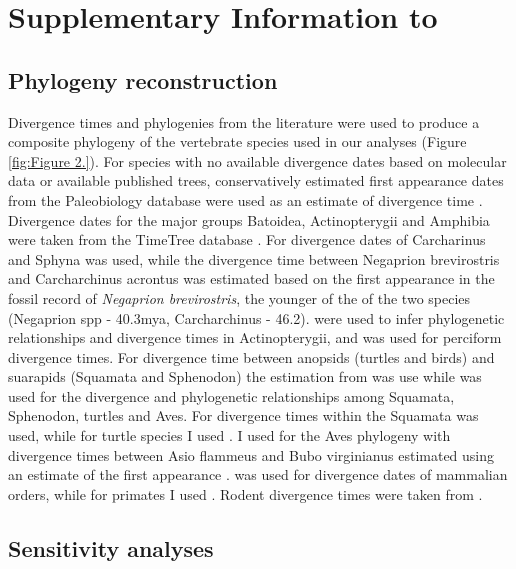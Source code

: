 \chapter{Supplementary Information to }%
\label{chap:Appendix A}
\section{Phylogeny reconstruction}

Divergence times and phylogenies from the literature were used to produce a composite phylogeny of the vertebrate species used in our analyses (Figure \ref{fig:Figure 2.}). For species with no available divergence dates based on molecular data or available published trees, conservatively estimated first appearance dates from the Paleobiology database were used as an estimate of divergence time \citep{alroy2008phanerozoic}. 
Divergence dates for the major groups Batoidea, Actinopterygii and Amphibia were taken from the TimeTree database \citep{hedges2006timetree}. For divergence dates of Carcharinus and Sphyna \cite{lim2010phylogeny} was used, while the divergence time between Negaprion brevirostris and Carcharchinus acrontus was estimated based on the first appearance in the fossil record of \textit{Negaprion brevirostris}, the younger of the of the two species (Negaprion spp - 40.3mya, Carcharchinus - 46.2). \cite{li2008optimal} were used to infer phylogenetic relationships and divergence times in Actinopterygii, and \cite{little2010evolutionary} was used for perciform divergence times. For divergence time between anopsids (turtles and birds) and suarapids (Squamata and Sphenodon) the estimation from \cite{benton2007paleontological} was use while \cite{perelman2011molecular} was used for the divergence and phylogenetic relationships among Squamata, Sphenodon, turtles and Aves. For divergence times within the Squamata \cite{wiens2006does} was used, while for turtle species I used \cite{naro2008evolutionary}. I used \cite{brown2008strong} for the Aves phylogeny with divergence times between Asio flammeus and Bubo virginianus estimated using an estimate of the first appearance \citep{janossy2011pleistocene}. \citep{murphy2007using} was used for divergence dates of mammalian orders, while for primates I used \cite{perelman2011molecular}. Rodent divergence times were taken from \cite{murphy2007using}.



\section{Sensitivity analyses}

